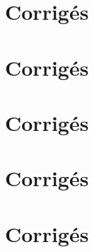 \documentclass[twoside, a4paper, 12pt, openright, fullpage]{book}
\begin{document}








\section{Corrigés}




\section{Corrigés}




\section{Corrigés}




\section{Corrigés}




\section{Corrigés}



\end{document}
